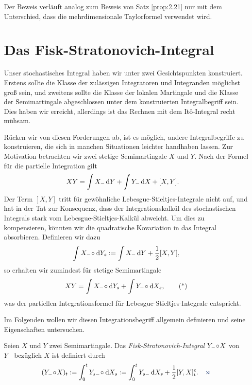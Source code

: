 Der Beweis verläuft analog zum Beweis von Satz \ref{prop:2.21} nur mit dem
Unterschied, dass die mehrdimensionale Taylorformel verwendet wird.

\section{Das Fisk-Stratonovich-Integral}

Unser stochastisches Integral haben wir unter zwei Gesichtspunkten konstruiert.
Erstens sollte die Klasse der zulässigen Integratoren und Integranden möglichst
groß sein, und zweitens sollte die Klasse der lokalen Martingale und die Klasse
der Semimartingale abgeschlossen unter dem konstruierten Integralbegriff sein.
Dies haben wir erreicht, allerdings ist das Rechnen mit dem Itô-Integral recht
mühsam.

Rücken wir von diesen Forderungen ab, ist es möglich, andere Integralbegriffe zu
konstruieren, die sich in manchen Situationen leichter handhaben lassen.
Zur Motivation betrachten wir zwei stetige Semimartingale $X$ und $Y$. Nach der
Formel für die partielle Integration gilt
\begin{align*}
XY &= \int X_- \,\mathrm{d} Y + \int Y_- \,\mathrm{d} X + [X,Y].
\end{align*}
Der Term $[X,Y]$ tritt für gewöhnliche Lebesgue-Stieltjes-Integrale nicht auf,
und hat in der Tat zur Konsequenz, dass der Integrationskalkül des
stochastischen Integrals stark vom Lebesgue-Stieltjes-Kalkül abweicht. Um dies
zu kompensieren, könnten wir die quadratische Kovariation in das Integral
absorbieren. Definieren wir dazu
\begin{align*}
\int X_-\!\circ\! \,\mathrm{d} Y_s := \int X_-\,\mathrm{d} Y + \frac{1}{2}[X,Y], 
\end{align*}
so erhalten wir zumindest für stetige Semimartingale
\begin{align*}
XY = \int X_-\!\circ\! \,\mathrm{d} Y_s + \int Y_-\!\circ\! \,\mathrm{d} X_s, \tag{*}
\end{align*}
was der partiellen Integrationsformel für Lebesgue-Stieltjes-Integrale
entspricht.

Im Folgenden wollen wir diesen Integrationsbegriff allgemein definieren und
seine Eigenschaften untersuchen. 

\begin{definition}
Seien $X$ und $Y$ zwei Semimartingale. Das \emph{Fisk-Stratonovich-Integral}
$Y_- \!\circ\! X$ von $Y_-$ bezüglich $X$ ist definiert durch
\begin{align*}
(Y_- \dcirc X)_t\defl \int_{0}^t Y_{s-} \dcirc \dX_s \defl \int_{0}^t Y_{s-} 
\dX_s + \frac{1}{2} [Y,X]_t^c.\fish
\end{align*}
\end{definition}

